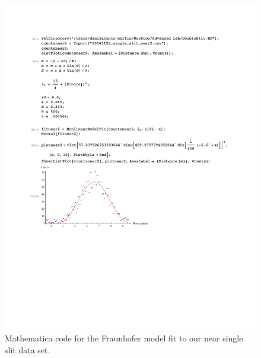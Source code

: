 \documentclass[prb,preprint]{revtex4-1}
\begin{document}
\begin{figure}[h!]
\centering
\includegraphics[width=6in]{SingleNearFraun.pdf}
\caption{Mathematica code for the Fraunhofer model fit to our near single slit data set.}
\label{SingleNearFraun}
\end{figure}
\end{document}
